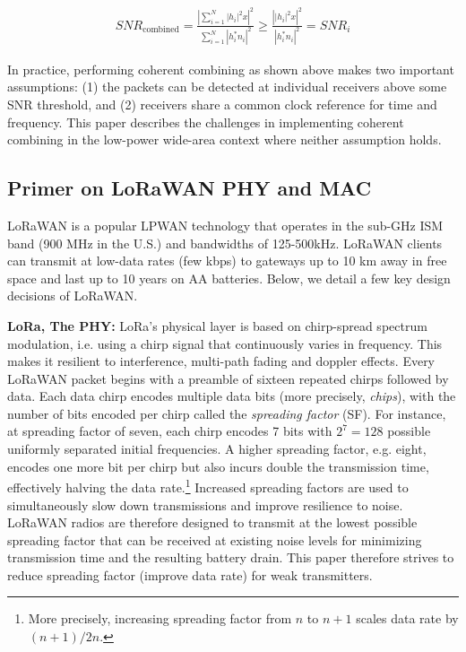 \compactimg

\begin{align*}
SNR_{\text{combined}} %
	= \frac{\left| \sum_{i=1}^N \left| h_i \right|^2 x \right|^2}{\sum_{i=1}^N \left| h^*_i n_i \right|^2} 
	\geq \frac{\left| \left| h_i \right|^2 x \right|^2}{\left| h^*_i n_i \right|^2} = SNR_i
\end{align*}

In practice, performing coherent combining as shown above makes two important
assumptions: (1) the packets can be detected at individual receivers above
some SNR threshold, and (2) receivers share a common clock reference for time
and frequency. This paper describes the challenges in implementing coherent
combining in the low-power wide-area context where neither assumption holds.


\subsection{Primer on LoRaWAN PHY and MAC}
\label{sec:lora}

LoRaWAN is a popular LPWAN technology that operates in the sub-GHz ISM band
(900 MHz in the U.S.) and bandwidths of 125-500kHz. LoRaWAN clients can
transmit at low-data rates (few kbps) to gateways up to 10 km away in free
space and last up to 10 years on AA batteries. Below, we detail a few key
design decisions of LoRaWAN.

\noindent \textbf{LoRa, The PHY: } LoRa's physical layer is based on
chirp-spread spectrum modulation, i.e. using a chirp signal that continuously
varies in frequency. This makes it resilient to interference, multi-path
fading and doppler effects. Every LoRaWAN packet begins with a preamble of
sixteen repeated chirps followed by data. Each data chirp encodes multiple
data bits (more precisely, \textit{chips}), with the number of  bits encoded
per chirp called the \textit{spreading factor} (SF). For instance, at
spreading factor of seven, each chirp encodes 7 bits with $2^7 = 128$ possible
uniformly separated initial frequencies. A higher spreading factor, e.g.
eight, encodes one more bit per chirp but also incurs double the transmission
time, effectively halving the data rate.\footnote{More precisely, increasing
spreading factor from $n$ to $n+1$ scales data rate by $(n+1)/2n$.} Increased
spreading factors are used to simultaneously slow down transmissions and
improve resilience to noise. LoRaWAN radios are therefore designed to transmit
at the lowest possible spreading factor that can be received at existing noise
levels for minimizing transmission time and the resulting battery drain. This
paper therefore strives to reduce spreading factor (improve data rate) for
weak transmitters.


